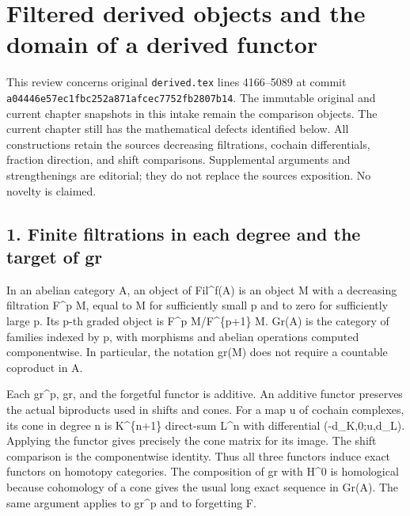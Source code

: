 \section{Filtered derived objects and the domain of a derived functor}\label{proofs-4166-5089-filtered-derived-objects-and-the-domain-of-a-derived-functor}

This review concerns original \texttt{derived.\allowbreak{}tex} lines 4166–\allowbreak{}5089 at commit \texttt{a04446e5\allowbreak{}7ec1fbc2\allowbreak{}52a871af\allowbreak{}cec7752f\allowbreak{}b2807b14}. The immutable original and current chapter snapshots in this intake remain the comparison objects. The current chapter still has the mathematical defects identified below. All constructions retain the source\textquotesingle s decreasing filtrations,\allowbreak{} cochain differentials,\allowbreak{} fraction direction,\allowbreak{} and shift comparisons. Supplemental arguments and strengthenings are editorial; they do not replace the source\textquotesingle s exposition. No novelty is claimed.

\subsection{1. Finite filtrations in each degree and the target of gr}\label{proofs-4166-5089-finite-filtrations-in-each-degree-and-the-target-of-gr}

In an abelian category A,\allowbreak{} an object of Fil\textasciicircum{}f(A)\allowbreak{} is an object M with a decreasing filtration F\^{}p M,\allowbreak{} equal to M for sufficiently small p and to zero for sufficiently large p. Its p-th graded object is F\^{}p M/\allowbreak{}F\textasciicircum{}\{p\allowbreak{}+1\} M. Gr(A)\allowbreak{} is the category of families indexed by p,\allowbreak{} with morphisms and abelian operations computed componentwise. In particular,\allowbreak{} the notation gr(M)\allowbreak{} does not require a countable coproduct in A.

Each gr\textasciicircum{}p,\allowbreak{} gr,\allowbreak{} and the forgetful functor is additive. An additive functor preserves the actual biproducts used in shifts and cones. For a map u of cochain complexes,\allowbreak{} its cone in degree n is K\textasciicircum{}\{n\allowbreak{}+1\} direct-sum L\^{}n with differential (-d\_\allowbreak{}K,\allowbreak{}0;u,\allowbreak{}d\_\allowbreak{}L)\allowbreak{}. Applying the functor gives precisely the cone matrix for its image. The shift comparison is the componentwise identity. Thus all three functors induce exact functors on homotopy categories. The composition of gr with H\^{}0 is homological because cohomology of a cone gives the usual long exact sequence in Gr(A)\allowbreak{}. The same argument applies to gr\^{}p and to forgetting F.

